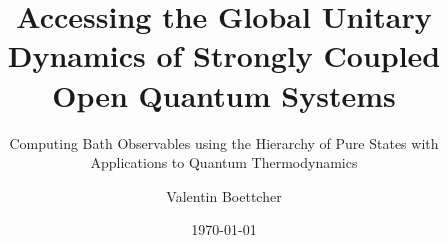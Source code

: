 \documentclass[fontsize=10pt,paper=b5,open=any,
twoside=yes,toc=listof,toc=bibliography,headings=optiontohead,
captions=nooneline,captions=tableabove,english,DIV=15,numbers=noenddot,final,parskip=half-,
headinclude=true,footinclude=false,BCOR=.5cm]{scrbook}
\title{Accessing the Global
  Unitary Dynamics of Strongly Coupled Open Quantum Systems}
\subtitle{Computing Bath Observables using the Hierarchy of Pure States
  with Applications to Quantum Thermodynamics}
\author{Valentin Boettcher}
\date{\today}
\begin{document}



\tableofcontents








\appendix



\printbibliography{}

\end{document}
